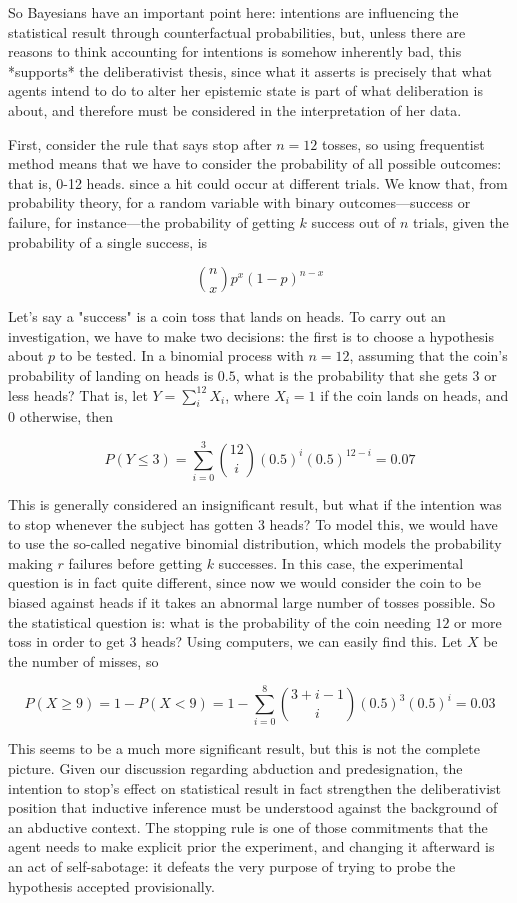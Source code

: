 So Bayesians have an important point here: intentions are influencing
the statistical result through counterfactual probabilities, but, unless
there are reasons to think accounting for intentions is somehow
inherently bad, this *supports* the deliberativist thesis, since what it
asserts is precisely that what agents intend to do to alter her
epistemic state is part of what deliberation is about, and therefore
must be considered in the interpretation of her data.

First, consider the rule that says stop after \(n=12\) tosses, so using
frequentist method means that we have to consider the probability of all
possible outcomes: that is, 0-12 heads. since a hit could occur at
different trials. We know that, from probability theory, for a random
variable with binary outcomes---success or failure, for instance---the
probability of getting \(k\) success out of \(n\) trials, given the
probability of a single success, is

\[{n \choose x} p^x (1-p)^{n-x}\]

Let's say a "success" is a coin toss that lands on heads. To carry out
an investigation, we have to make two decisions: the first is to choose
a hypothesis about \(p\) to be tested. In a binomial process with
\(n=12\), assuming that the coin's probability of landing on heads is
\(0.5\), what is the probability that she gets 3 or less heads? That is,
let \(Y=\sum_i^{12} X_i\), where \(X_i = 1\) if the coin lands on heads,
and 0 otherwise, then

\[P(Y \leq 3 ) =  \sum_{i=0}^{3} {12 \choose i} (0.5)^i (0.5)^{12-i} = 0.07\]

This is generally considered an insignificant result, but what if the
intention was to stop whenever the subject has gotten 3 heads? To model
this, we would have to use the so-called negative binomial distribution,
which models the probability making \(r\) failures before getting \(k\)
successes. In this case, the experimental question is in fact quite
different, since now we would consider the coin to be biased against
heads if it takes an abnormal large number of tosses possible. So the
statistical question is: what is the probability of the coin needing
\(12\) or more toss in order to get 3 heads? Using computers, we can
easily find this. Let \(X\) be the number of misses, so

\[P(X \geq 9) = 1 - P(X <9) = 1 - \sum_{i=0}^{8} {3+i-1 \choose i} (0.5)^3 (0.5)^{i} =0.03\]

This seems to be a much more significant result, but this is not the
complete picture. Given our discussion regarding abduction and
predesignation, the intention to stop's effect on statistical result in
fact strengthen the deliberativist position that inductive inference
must be understood against the background of an abductive context. The
stopping rule is one of those commitments that the agent needs to make
explicit prior the experiment, and changing it afterward is an act of
self-sabotage: it defeats the very purpose of trying to probe the
hypothesis accepted provisionally.


